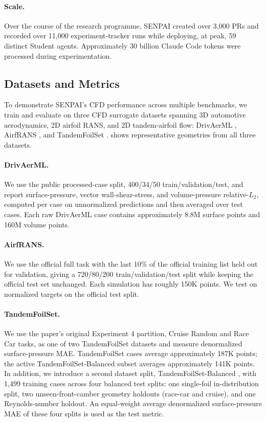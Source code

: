 \documentclass{article}
\begin{document}
\paragraph{Scale.}
Over the course of the research programme, SENPAI created over 3,000 PRs and recorded over 11,000 experiment-tracker runs while deploying, at peak, 59 distinct Student agents. Approximately 30 billion Claude Code tokens were processed during experimentation.

\subsection{Datasets and Metrics}

To demonstrate SENPAI's CFD performance across multiple benchmarks, we train and evaluate on three CFD surrogate datasets spanning 3D automotive aerodynamics, 2D airfoil RANS, and 2D tandem-airfoil flow: DrivAerML \citep{ashton2024drivaerml}, AirfRANS \citep{bonnet2022airfrans}, and TandemFoilSet \citep{lim2026tandemfoilset}.  shows representative geometries from all three datasets.

\paragraph{DrivAerML.}
We use the public processed-case split, 400/34/50 train/validation/test, and report surface-pressure, vector wall-shear-stress, and volume-pressure relative-$L_2$, computed per case on unnormalized predictions and then averaged over test cases. Each raw DrivAerML case contains approximately 8.8M surface points and 160M volume points.

\paragraph{AirfRANS.}
We use the official full task with the last 10\% of the official training list held out for validation, giving a 720/80/200 train/validation/test split while keeping the official test set unchanged. Each simulation has roughly 150K points. We test on normalized targets on the official test split.

\paragraph{TandemFoilSet.}
We use the paper's original Experiment 4 partition, Cruise Random and Race Car tasks, as one of two TandemFoilSet datasets and measure denormalized surface-pressure MAE. TandemFoilSet cases average approximately 187K points; the active TandemFoilSet-Balanced subset averages approximately 141K points. In addition, we introduce a second dataset split, TandemFoilSet-Balanced \citep{mcguire2026tandemfoilsetbalanced}, with 1,499 training cases across four balanced test splits: one single-foil in-distribution split, two unseen-front-camber geometry holdouts (race-car and cruise), and one Reynolds-number holdout. An equal-weight average denormalized surface-pressure MAE of these four splits is used as the test metric.
\end{document}
